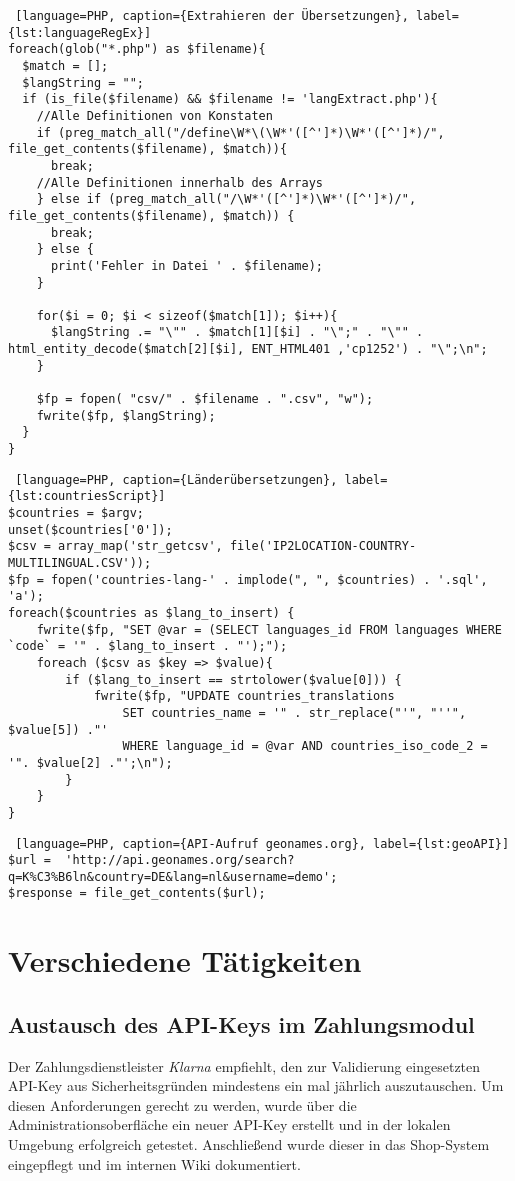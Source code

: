 \begin{lstlisting} [language=PHP, caption={Extrahieren der Übersetzungen}, label={lst:languageRegEx}]
foreach(glob("*.php") as $filename){
  $match = [];
  $langString = "";
  if (is_file($filename) && $filename != 'langExtract.php'){
    //Alle Definitionen von Konstaten
    if (preg_match_all("/define\W*\(\W*'([^']*)\W*'([^']*)/", file_get_contents($filename), $match)){
      break;
	//Alle Definitionen innerhalb des Arrays
	} else if (preg_match_all("/\W*'([^']*)\W*'([^']*)/", file_get_contents($filename), $match)) {
	  break;
	} else {
	  print('Fehler in Datei ' . $filename);
	}

	for($i = 0; $i < sizeof($match[1]); $i++){
	  $langString .= "\"" . $match[1][$i] . "\";" . "\"" . html_entity_decode($match[2][$i], ENT_HTML401 ,'cp1252') . "\";\n";
	}

	$fp = fopen( "csv/" . $filename . ".csv", "w");
	fwrite($fp, $langString);
  }
}
\end{lstlisting}

\begin{lstlisting} [language=PHP, caption={Länderübersetzungen}, label={lst:countriesScript}]
$countries = $argv;
unset($countries['0']);
$csv = array_map('str_getcsv', file('IP2LOCATION-COUNTRY-MULTILINGUAL.CSV'));
$fp = fopen('countries-lang-' . implode(", ", $countries) . '.sql', 'a');
foreach($countries as $lang_to_insert) {
	fwrite($fp, "SET @var = (SELECT languages_id FROM languages WHERE `code` = '" . $lang_to_insert . "');");
	foreach ($csv as $key => $value){
		if ($lang_to_insert == strtolower($value[0])) {
			fwrite($fp, "UPDATE countries_translations 
				SET countries_name = '" . str_replace("'", "''", $value[5]) ."'
				WHERE language_id = @var AND countries_iso_code_2 = '". $value[2] ."';\n");
		}
	}
}
\end{lstlisting}

\begin{lstlisting} [language=PHP, caption={API-Aufruf geonames.org}, label={lst:geoAPI}]
$url = 	'http://api.geonames.org/search?q=K%C3%B6ln&country=DE&lang=nl&username=demo';
$response = file_get_contents($url);
\end{lstlisting}

\section{Verschiedene Tätigkeiten} %
\subsection{Austausch des API-Keys im Zahlungsmodul}
Der Zahlungsdienstleister \textit{Klarna} empfiehlt, den zur Validierung eingesetzten API-Key aus Sicherheitsgründen mindestens ein mal jährlich auszutauschen. Um diesen Anforderungen gerecht zu werden, wurde über die Administrationsoberfläche ein neuer API-Key erstellt und in der lokalen Umgebung erfolgreich getestet. Anschließend wurde dieser in das Shop-System eingepflegt und im internen Wiki dokumentiert.
